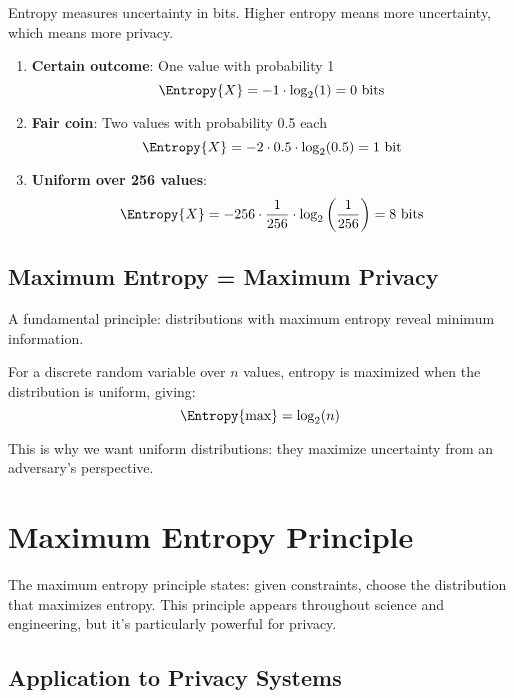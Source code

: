 Entropy measures uncertainty in bits. Higher entropy means more uncertainty, which means more privacy.

\begin{example}
\begin{enumerate}
    \item \textbf{Certain outcome}: One value with probability 1
    \[
    \Entropy{X} = -1 \cdot \log_2(1) = 0 \text{ bits}
    \]
    
    \item \textbf{Fair coin}: Two values with probability 0.5 each
    \[
    \Entropy{X} = -2 \cdot 0.5 \cdot \log_2(0.5) = 1 \text{ bit}
    \]
    
    \item \textbf{Uniform over 256 values}: 
    \[
    \Entropy{X} = -256 \cdot \frac{1}{256} \cdot \log_2\left(\frac{1}{256}\right) = 8 \text{ bits}
    \]
\end{enumerate}
\end{example}

\subsection{Maximum Entropy = Maximum Privacy}

A fundamental principle: distributions with maximum entropy reveal minimum information.

\begin{theorem}
For a discrete random variable over $n$ values, entropy is maximized when the distribution is uniform, giving:
\[
\Entropy{\text{max}} = \log_2(n)
\]
\end{theorem}

This is why we want uniform distributions: they maximize uncertainty from an adversary's perspective.

\section{Maximum Entropy Principle}

The maximum entropy principle states: given constraints, choose the distribution that maximizes entropy. This principle appears throughout science and engineering, but it's particularly powerful for privacy.

\subsection{Application to Privacy Systems}

